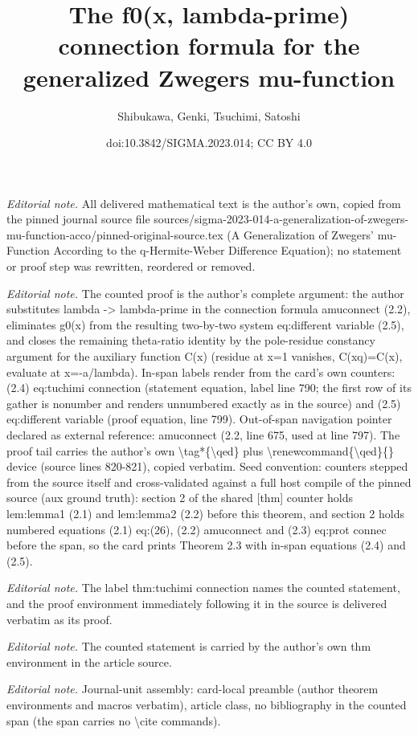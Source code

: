 \documentclass[10pt,a4paper]{article}
\title{The f0(x, lambda-prime) connection formula for the generalized Zwegers mu-function}
\author{Shibukawa, Genki, Tsuchimi, Satoshi}
\date{doi:10.3842/SIGMA.2023.014; CC BY 4.0}
\numberwithin{equation}{section}
\theoremstyle{definition}
\begin{document}
\maketitle
\setcounter{section}{2}
\setcounter{thm}{2}
\setcounter{equation}{3}
\noindent\textit{Editorial note.} All delivered mathematical text is the author's own, copied from the pinned journal source file sources/sigma-2023-014-a-generalization-of-zwegers-mu-function-acco/pinned-original-source.tex (A Generalization of Zwegers' mu-Function According to the q-Hermite-Weber Difference Equation); no statement or proof step was rewritten, reordered or removed.\par\medskip
\noindent\textit{Editorial note.} The counted proof is the author's complete argument: the author substitutes lambda -> lambda-prime in the connection formula amuconnect (2.2), eliminates g0(x) from the resulting two-by-two system eq:different variable (2.5), and closes the remaining theta-ratio identity by the pole-residue constancy argument for the auxiliary function C(x) (residue at x=1 vanishes, C(xq)=C(x), evaluate at x=-a/lambda). In-span labels render from the card's own counters: (2.4) eq:tuchimi connection (statement equation, label line 790; the first row of its gather is nonumber and renders unnumbered exactly as in the source) and (2.5) eq:different variable (proof equation, line 799). Out-of-span navigation pointer declared as external reference: amuconnect (2.2, line 675, used at line 797). The proof tail carries the author's own \textbackslash{}tag*\{\textbackslash{}qed\} plus \textbackslash{}renewcommand\{\textbackslash{}qed\}\{\} device (source lines 820-821), copied verbatim. Seed convention: counters stepped from the source itself and cross-validated against a full host compile of the pinned source (aux ground truth): section 2 of the shared [thm] counter holds lem:lemma1 (2.1) and lem:lemma2 (2.2) before this theorem, and section 2 holds numbered equations (2.1) eq:(26), (2.2) amuconnect and (2.3) eq:prot connec before the span, so the card prints Theorem 2.3 with in-span equations (2.4) and (2.5).\par\medskip
\noindent\textit{Editorial note.} The label thm:tuchimi connection names the counted statement, and the proof environment immediately following it in the source is delivered verbatim as its proof.\par\medskip
\noindent\textit{Editorial note.} The counted statement is carried by the author's own thm environment in the article source.\par\medskip
\noindent\textit{Editorial note.} Journal-unit assembly: card-local preamble (author theorem environments and macros verbatim), article class, no bibliography in the counted span (the span carries no \textbackslash{}cite commands).\par\medskip
\end{document}
